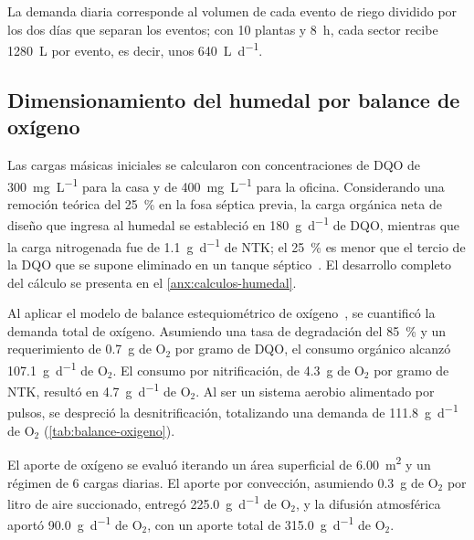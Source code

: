 La demanda diaria corresponde al volumen de cada evento de riego dividido por los dos días que separan los eventos; con 10 plantas y \qty{8}{\hour}, cada sector recibe \qty{1280}{\liter} por evento, es decir, unos \qty{640}{\liter\per\day}.

\subsection{Dimensionamiento del humedal por balance de oxígeno}

Las cargas másicas iniciales se calcularon con concentraciones de DQO de \qty{300}{\milli\gram\per\liter} para la casa y de \qty{400}{\milli\gram\per\liter} para la oficina.
Considerando una remoción teórica del \qty{25}{\percent} en la fosa séptica previa, la carga orgánica neta de diseño que ingresa al humedal se estableció en \qty{180}{\gram\per\day} de DQO, mientras que la carga nitrogenada fue de \qty{1.1}{\gram\per\day} de NTK; el \qty{25}{\percent} es menor que el tercio de la DQO que se supone eliminado en un tanque séptico~\parencite{dotro2021humedales}.
El desarrollo completo del cálculo se presenta en el \cref{anx:calculos-humedal}.

Al aplicar el modelo de balance estequiométrico de oxígeno~\parencite{platzer1999design}, se cuantificó la demanda total de oxígeno.
Asumiendo una tasa de degradación del \qty{85}{\percent} y un requerimiento de \qty{0.7}{\gram} de O$_2$ por gramo de DQO, el consumo orgánico alcanzó \qty{107.1}{\gram\per\day} de O$_2$.
El consumo por nitrificación, de \qty{4.3}{\gram} de O$_2$ por gramo de NTK, resultó en \qty{4.7}{\gram\per\day} de O$_2$.
Al ser un sistema aerobio alimentado por pulsos, se despreció la desnitrificación, totalizando una demanda de \qty{111.8}{\gram\per\day} de O$_2$ (\cref{tab:balance-oxigeno}).

El aporte de oxígeno se evaluó iterando un área superficial de \qty{6.00}{\square\meter} y un régimen de 6 cargas diarias.
El aporte por convección, asumiendo \qty{0.3}{\gram} de O$_2$ por litro de aire succionado, entregó \qty{225.0}{\gram\per\day} de O$_2$, y la difusión atmosférica aportó \qty{90.0}{\gram\per\day} de O$_2$, con un aporte total de \qty{315.0}{\gram\per\day} de O$_2$.

